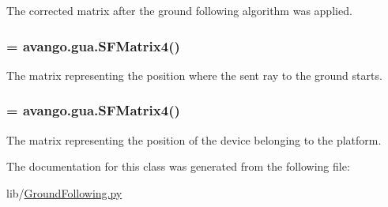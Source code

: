 \-The corrected matrix after the ground following algorithm was applied. 

\hypertarget{classlib_1_1GroundFollowing_1_1GroundFollowing_adbae19702e3080255c5463375e7c57e3}{
\subsubsection[{sf\-\_\-gf\-\_\-start\-\_\-mat}]{ = avango.\-gua.\-S\-F\-Matrix4()}}\label{classlib_1_1GroundFollowing_1_1GroundFollowing_adbae19702e3080255c5463375e7c57e3}


\-The matrix representing the position where the sent ray to the ground starts. 

\hypertarget{classlib_1_1GroundFollowing_1_1GroundFollowing_a15123ba4f08697cfe7493a29fc5161e5}{
\subsubsection[{sf\-\_\-station\-\_\-mat}]{ = avango.\-gua.\-S\-F\-Matrix4()}}\label{classlib_1_1GroundFollowing_1_1GroundFollowing_a15123ba4f08697cfe7493a29fc5161e5}


\-The matrix representing the position of the device belonging to the platform. 



\-The documentation for this class was generated from the following file\-:\begin{DoxyCompactItemize}
\item 
lib/\hyperlink{GroundFollowing_8py}{\-Ground\-Following.\-py}\end{DoxyCompactItemize}
